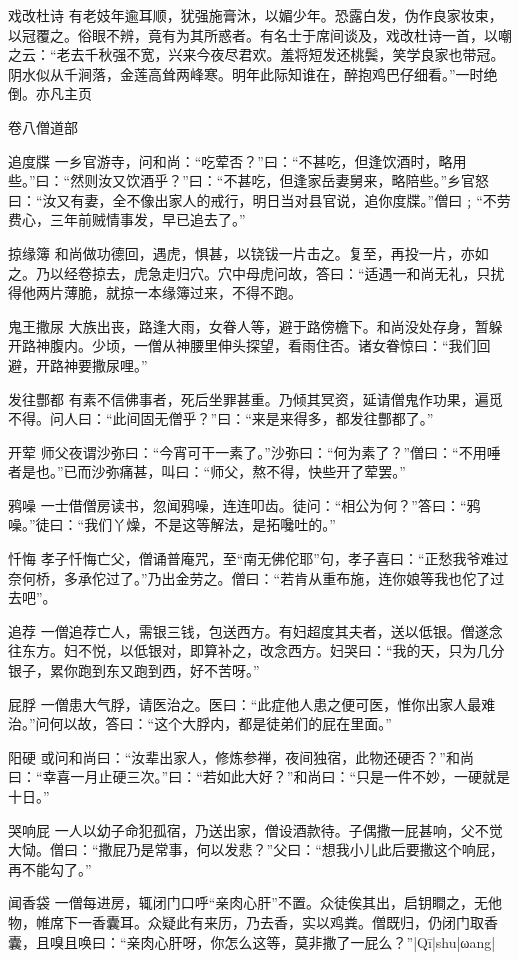 \documentclass[12pt,UTF8]{ctexbook}
\begin{document}
戏改杜诗
有老妓年逾耳顺，犹强施膏沐，以媚少年。恐露白发，伪作良家妆束，以冠覆之。俗眼不辨，竟有为其所惑者。有名士于席间谈及，戏改杜诗一首，以嘲之云：“老去千秋强不宽，兴来今夜尽君欢。羞将短发还桃鬓，笑学良家也带冠。阴水似从千涧落，金莲高耸两峰寒。明年此际知谁在，醉抱鸡巴仔细看。”一时绝倒。亦凡主页

卷八僧道部

追度牒
一乡官游寺，问和尚：“吃荤否？”曰：“不甚吃，但逢饮酒时，略用些。”曰：“然则汝又饮酒乎？”曰：“不甚吃，但逢家岳妻舅来，略陪些。”乡官怒曰：“汝又有妻，全不像出家人的戒行，明日当对县官说，追你度牒。”僧曰﹔“不劳费心，三年前贼情事发，早已追去了。”

掠缘簿
和尚做功德回，遇虎，惧甚，以铙钹一片击之。复至，再投一片，亦如之。乃以经卷掠去，虎急走归穴。穴中母虎问故，答曰：“适遇一和尚无礼，只扰得他两片薄脆，就掠一本缘簿过来，不得不跑。

鬼王撒尿
大族出丧，路逢大雨，女眷人等，避于路傍檐下。和尚没处存身，暂躲开路神腹内。少顷，一僧从神腰里伸头探望，看雨住否。诸女眷惊曰：“我们回避，开路神要撒尿哩。”

发往酆都
有素不信佛事者，死后坐罪甚重。乃倾其冥资，延请僧鬼作功果，遍觅不得。问人曰：“此间固无僧乎？”曰：“来是来得多，都发往酆都了。”

开荤
师父夜谓沙弥曰：“今宵可干一素了。”沙弥曰：“何为素了？”僧曰：“不用唾者是也。”已而沙弥痛甚，叫曰：“师父，熬不得，快些开了荤罢。”

鸦噪
一士借僧房读书，忽闻鸦噪，连连叩齿。徒问：“相公为何？”答曰：“鸦噪。”徒曰：“我们丫燥，不是这等解法，是拓嚵吐的。”

忏悔
孝子忏悔亡父，僧诵普庵咒，至“南无佛佗耶”句，孝子喜曰：“正愁我爷难过奈何桥，多承佗过了。”乃出金劳之。僧曰：“若肯从重布施，连你娘等我也佗了过去吧”。

追荐
一僧追荐亡人，需银三钱，包送西方。有妇超度其夫者，送以低银。僧遂念往东方。妇不悦，以低银对，即算补之，改念西方。妇哭曰：“我的天，只为几分银子，累你跑到东又跑到西，好不苦呀。”

屁脬
一僧患大气脬，请医治之。医曰：“此症他人患之便可医，惟你出家人最难治。”问何以故，答曰：“这个大脬内，都是徒弟们的屁在里面。”

阳硬
或问和尚曰：“汝辈出家人，修炼参禅，夜间独宿，此物还硬否？”和尚曰：“幸喜一月止硬三次。”曰：“若如此大好？”和尚曰：“只是一件不妙，一硬就是十日。”

哭响屁
一人以幼子命犯孤宿，乃送出家，僧设酒款待。子偶撒一屁甚响，父不觉大恸。僧曰：“撒屁乃是常事，何以发悲？”父曰：“想我小儿此后要撒这个响屁，再不能勾了。”

闻香袋
一僧每进房，辄闭门口呼“亲肉心肝”不置。众徒俟其出，启钥瞷之，无他物，帷席下一香囊耳。众疑此有来历，乃去香，实以鸡粪。僧既归，仍闭门取香囊，且嗅且唤曰：“亲肉心肝呀，你怎么这等，莫非撒了一屁么？”|Qī|shu|ωang|
\end{document}
